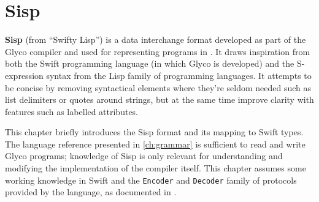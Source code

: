 \documentclass[main.tex]{subfiles}
\begin{document}
\onlyinsubfile{\mainmatter{}\appendix{}}

\chapter{Sisp} \label{ch:sisp}
\textbf{Sisp} (from \enquote{Swifty Lisp}) is a data interchange format developed as part of the Glyco compiler and used for representing programs in . It draws inspiration from both the Swift programming language (in which Glyco is developed) and the S-expression syntax from the Lisp family of programming languages. It attempts to be concise by removing syntactical elements where they're seldom needed such as list delimiters or quotes around strings, but at the same time improve clarity with features such as labelled attributes.

This chapter briefly introduces the Sisp format and its mapping to Swift types. The language reference presented in \cref{ch:grammar} is sufficient to read and write Glyco programs; knowledge of Sisp is only relevant for understanding and modifying the implementation of the compiler itself. This chapter assumes some working knowledge in Swift and the \texttt{Encoder} and \texttt{Decoder} family of protocols provided by the language, as documented in \cite{swiftcoding}.
\end{document}
